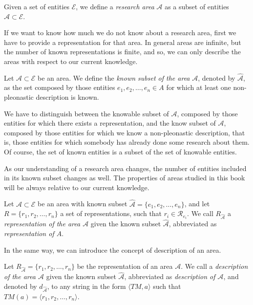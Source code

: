 \begin{definition}
Given a set of entities $\mathcal{E}$, we define a \emph{research area} $\mathcal{A}$ as a subset of entities $\mathcal{A} \subset \mathcal{E}$.
\end{definition}

If we want to know how much we do not know about a research area, first we have to provide a representation for that area. In general areas are infinite, but the number of known representations is finite, and so, we can only describe the areas with respect to our current knowledge.

\begin{definition}
Let $\mathcal{A} \subset \mathcal{E}$ be an area. We define the \emph{known subset of the area} $\mathcal{A}$, denoted by $\hat{\mathcal{A}}$, as the set composed by those entities $e_1, e_2, \ldots, e_n \in A$ for which at least one non-pleonastic description is known.
\end{definition}

We have to distinguish between the knowable subset of $\mathcal{A}$, composed by those entities for which there exists a representation, and the know subset of $\mathcal{A}$, composed by those entities for which we know a non-pleonastic description, that is, those entities for which somebody has already done some research about them. Of course, the set of known entities is a subset of the set of knowable entities.

As our understanding of a research area changes, the number of entities included in its known subset changes as well. The properties of areas studied in this book will be always relative to our current knowledge.

\begin{definition}
Let $\mathcal{A} \subset \mathcal{E}$ be an area with known subset $\hat{\mathcal{A}} = \{ e_1, e_2, \ldots, e_n \}$, and let  $R = \{ r_1, r_2, \ldots, r_n \}$ a set of representations, such that $r_i \in \mathcal{R}_{e_i}$. We call $R_{\hat{\mathcal{A}}}$ a \emph{representation of the area $\mathcal{A}$} given the known subset $\hat{\mathcal{A}}$, abbreviated as \emph{representation of $A$}.
\end{definition}

In the same way, we can introduce the concept of description of an area.

\begin{definition}
Let $R_{\hat{\mathcal{A}}} = \{ r_1, r_2, \ldots, r_n \}$ be the representation of an area $\mathcal{A}$. We call a \emph{description of the area $\mathcal{A}$} given the known subset $\hat{\mathcal{A}}$, abbreviated as \emph{description of $\mathcal{A}$}, and denoted by $d_{\hat{\mathcal{A}}}$, to any string in the form $\langle TM, a\rangle$ such that $TM(a) = \langle r_1, r_2, \ldots, r_n\rangle$.
\end{definition}

